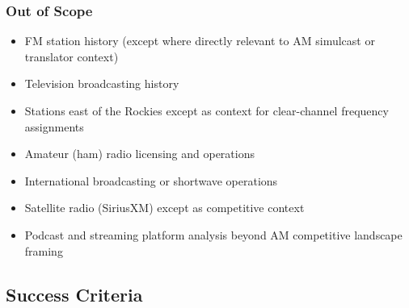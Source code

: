 \documentclass[11pt,letterpaper]{article}
\begin{document}
\begin{asciibox}
\subsubsection{Out of Scope}
\begin{itemize}[leftmargin=*]
  \item FM station history (except where directly relevant to AM simulcast or translator context)
  \item Television broadcasting history
  \item Stations east of the Rockies except as context for clear-channel frequency assignments
  \item Amateur (ham) radio licensing and operations
  \item International broadcasting or shortwave operations
  \item Satellite radio (SiriusXM) except as competitive context
  \item Podcast and streaming platform analysis beyond AM competitive landscape framing
\end{itemize}

\subsection{Success Criteria}


\end{asciibox}
\end{document}
